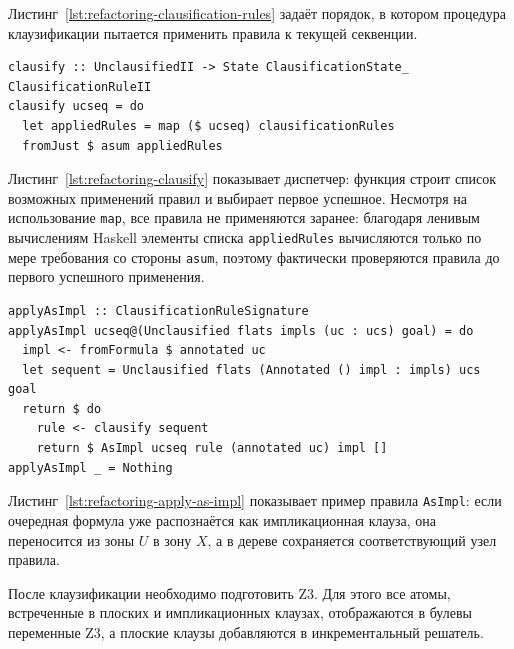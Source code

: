 \documentclass[14pt, russian]{scrartcl}
\begin{document}
Листинг~\ref{lst:refactoring-clausification-rules} задаёт порядок, в котором
процедура клаузификации пытается применить правила к текущей секвенции.

\begin{listing}[!htb]
\caption{Функция клаузификации \texttt{clausify}}
\label{lst:refactoring-clausify}
\begin{verbatim}
clausify :: UnclausifiedII -> State ClausificationState_ ClausificationRuleII
clausify ucseq = do
  let appliedRules = map ($ ucseq) clausificationRules
  fromJust $ asum appliedRules
\end{verbatim}
\end{listing}

Листинг~\ref{lst:refactoring-clausify} показывает диспетчер: функция строит
список возможных применений правил и выбирает первое успешное. Несмотря на
использование \texttt{map}, все правила не применяются заранее: благодаря
ленивым вычислениям Haskell элементы списка \texttt{appliedRules} вычисляются
только по мере требования со стороны \texttt{asum}, поэтому фактически
проверяются правила до первого успешного применения.

\begin{listing}[!htb]
\caption{Правило клаузификации \texttt{applyAsImpl}}
\label{lst:refactoring-apply-as-impl}
\begin{verbatim}
applyAsImpl :: ClausificationRuleSignature
applyAsImpl ucseq@(Unclausified flats impls (uc : ucs) goal) = do
  impl <- fromFormula $ annotated uc
  let sequent = Unclausified flats (Annotated () impl : impls) ucs goal
  return $ do
    rule <- clausify sequent
    return $ AsImpl ucseq rule (annotated uc) impl []
applyAsImpl _ = Nothing
\end{verbatim}
\end{listing}

Листинг~\ref{lst:refactoring-apply-as-impl} показывает пример правила
\texttt{AsImpl}: если очередная формула уже распознаётся как импликационная
клауза, она переносится из зоны $U$ в зону $X$, а в дереве сохраняется
соответствующий узел правила.

После клаузификации необходимо подготовить Z3. Для этого все атомы, встреченные
в плоских и импликационных клауза\-х, отображаются в булевы переменные Z3, а
плоские клаузы добавляются в инкрементальный решатель.
\end{document}
